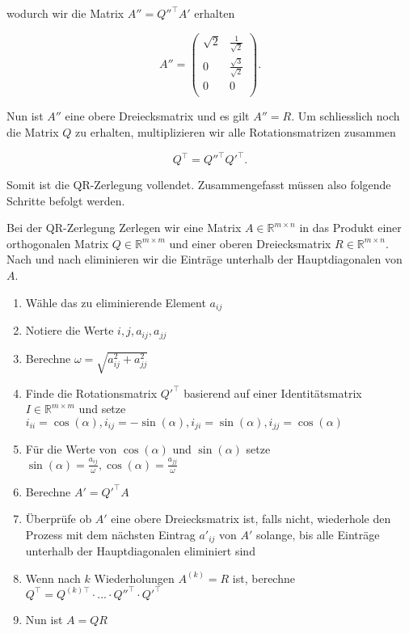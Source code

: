 wodurch wir die Matrix \( A'' = Q''^\top A' \) erhalten

\begin{equation*}
    A'' =
    \begin{pmatrix}
        \sqrt{2} & \frac{1}{\sqrt{2}} \\
        0 & \frac{\sqrt{3}}{\sqrt{2}} \\
        0 & 0 \\
    \end{pmatrix}.
\end{equation*}

Nun ist \( A'' \) eine obere Dreiecksmatrix und es gilt \( A'' = R \). Um schliesslich noch die Matrix \( Q \) zu erhalten, multiplizieren wir alle Rotationsmatrizen zusammen 

\begin{equation*}
    Q^\top = Q''^\top Q'^\top.
\end{equation*}

Somit ist die QR-Zerlegung vollendet. Zusammengefasst müssen also folgende Schritte befolgt werden. 

\begin{tcolorbox}[colback=gray!30, colframe=gray!80, title=QR-Zerlegung]
    Bei der QR-Zerlegung Zerlegen wir eine Matrix \( A \in \mathbb{R}^{m \times n} \) in das Produkt einer orthogonalen Matrix \( Q \in \mathbb{R}^{m \times m} \) und einer oberen Dreiecksmatrix \( R \in \mathbb{R}^{m \times n} \). Nach und nach eliminieren wir die Einträge unterhalb der Hauptdiagonalen von \( A \). 
    \begin{enumerate}
        \item Wähle das zu eliminierende Element \( a_{ij} \)
        \item Notiere die Werte \( i, j, a_{ij}, a_{jj} \)
        \item Berechne \( \omega = \sqrt{a_{ij}^2 + a_{jj}^2} \)
        \item Finde die Rotationsmatrix \( Q'^\top \) basierend auf einer Identitätsmatrix \( I \in \mathbb{R}^{m \times m} \) und setze \( i_{ii} = \cos(\alpha), i_{ij} = -\sin(\alpha), i_{ji} = \sin(\alpha), i_{jj} = \cos(\alpha) \)
        \item Für die Werte von \( \cos(\alpha) \) und \( \sin(\alpha) \) setze \( \sin(\alpha) = \frac{a_{ij}}{\omega}, \cos(\alpha) = \frac{a_{jj}}{\omega} \)
        \item Berechne \( A' = Q'^\top A \)
        \item Überprüfe ob \( A' \) eine obere Dreiecksmatrix ist, falls nicht, wiederhole den Prozess mit dem nächsten Eintrag \( a'_{ij} \) von \( A' \) solange, bis alle Einträge unterhalb der Hauptdiagonalen eliminiert sind
        \item Wenn nach \( k \) Wiederholungen \( A^{(k)} = R \) ist, berechne \( Q^\top = Q^{(k) \top} \cdot ... \cdot Q''^\top \cdot Q'^\top \)
        \item Nun ist \(A = QR\)
    \end{enumerate}
\end{tcolorbox}

